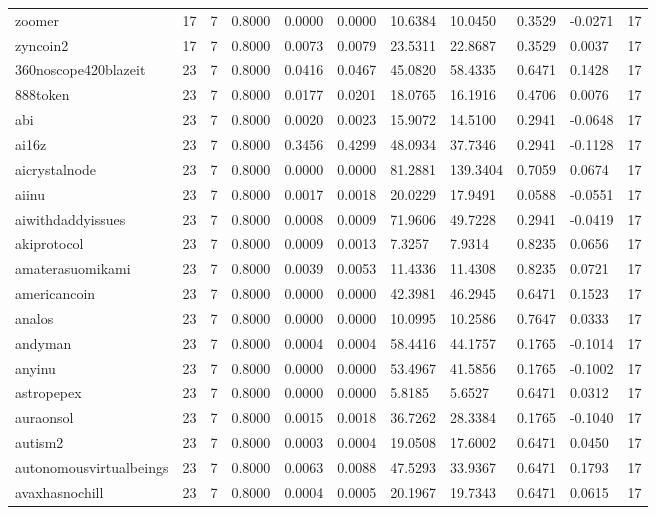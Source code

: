 \begin{table}[htbp]
\begin{tabular}{lllllllllll}
zoomer & 17 & 7 & 0.8000 & 0.0000 & 0.0000 & 10.6384 & 10.0450 & 0.3529 & -0.0271 & 17 \\
zyncoin2 & 17 & 7 & 0.8000 & 0.0073 & 0.0079 & 23.5311 & 22.8687 & 0.3529 & 0.0037 & 17 \\
360noscope420blazeit & 23 & 7 & 0.8000 & 0.0416 & 0.0467 & 45.0820 & 58.4335 & 0.6471 & 0.1428 & 17 \\
888token & 23 & 7 & 0.8000 & 0.0177 & 0.0201 & 18.0765 & 16.1916 & 0.4706 & 0.0076 & 17 \\
abi & 23 & 7 & 0.8000 & 0.0020 & 0.0023 & 15.9072 & 14.5100 & 0.2941 & -0.0648 & 17 \\
ai16z & 23 & 7 & 0.8000 & 0.3456 & 0.4299 & 48.0934 & 37.7346 & 0.2941 & -0.1128 & 17 \\
aicrystalnode & 23 & 7 & 0.8000 & 0.0000 & 0.0000 & 81.2881 & 139.3404 & 0.7059 & 0.0674 & 17 \\
aiinu & 23 & 7 & 0.8000 & 0.0017 & 0.0018 & 20.0229 & 17.9491 & 0.0588 & -0.0551 & 17 \\
aiwithdaddyissues & 23 & 7 & 0.8000 & 0.0008 & 0.0009 & 71.9606 & 49.7228 & 0.2941 & -0.0419 & 17 \\
akiprotocol & 23 & 7 & 0.8000 & 0.0009 & 0.0013 & 7.3257 & 7.9314 & 0.8235 & 0.0656 & 17 \\
amaterasuomikami & 23 & 7 & 0.8000 & 0.0039 & 0.0053 & 11.4336 & 11.4308 & 0.8235 & 0.0721 & 17 \\
americancoin & 23 & 7 & 0.8000 & 0.0000 & 0.0000 & 42.3981 & 46.2945 & 0.6471 & 0.1523 & 17 \\
analos & 23 & 7 & 0.8000 & 0.0000 & 0.0000 & 10.0995 & 10.2586 & 0.7647 & 0.0333 & 17 \\
andyman & 23 & 7 & 0.8000 & 0.0004 & 0.0004 & 58.4416 & 44.1757 & 0.1765 & -0.1014 & 17 \\
anyinu & 23 & 7 & 0.8000 & 0.0000 & 0.0000 & 53.4967 & 41.5856 & 0.1765 & -0.1002 & 17 \\
astropepex & 23 & 7 & 0.8000 & 0.0000 & 0.0000 & 5.8185 & 5.6527 & 0.6471 & 0.0312 & 17 \\
auraonsol & 23 & 7 & 0.8000 & 0.0015 & 0.0018 & 36.7262 & 28.3384 & 0.1765 & -0.1040 & 17 \\
autism2 & 23 & 7 & 0.8000 & 0.0003 & 0.0004 & 19.0508 & 17.6002 & 0.6471 & 0.0450 & 17 \\
autonomousvirtualbeings & 23 & 7 & 0.8000 & 0.0063 & 0.0088 & 47.5293 & 33.9367 & 0.6471 & 0.1793 & 17 \\
avaxhasnochill & 23 & 7 & 0.8000 & 0.0004 & 0.0005 & 20.1967 & 19.7343 & 0.6471 & 0.0615 & 17 \\

\end{tabular}
\end{table}
